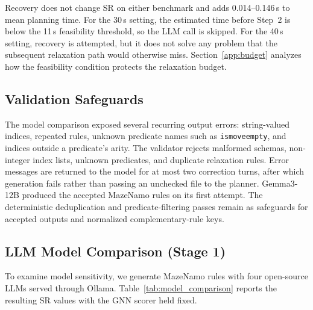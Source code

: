 \documentclass{ieeeaccess}
\newcommand{\sref}[1]{Section~\ref{#1}}
\newcommand{\tref}[1]{Table~\ref{#1}}
\begin{document}
Recovery does not change SR on either benchmark and adds 0.014--0.146\,s to mean planning time.
For the 30\,s setting, the estimated time before Step~2 is below the 11\,s feasibility threshold, so the LLM call is skipped. For the 40\,s setting, recovery is attempted, but it does not solve any problem that the subsequent relaxation path would otherwise miss.
\sref{app:budget} analyzes how the feasibility condition protects the relaxation budget.

\subsection{Validation Safeguards}
\label{sec:ablation_pipeline}

The model comparison exposed several recurring output errors: string-valued indices, repeated rules, unknown predicate names such as \texttt{ismoveempty}, and indices outside a predicate's arity.
The validator rejects malformed schemas, non-integer index lists, unknown predicates, and duplicate relaxation rules. Error messages are returned to the model for at most two correction turns, after which generation fails rather than passing an unchecked file to the planner.
Gemma3-12B produced the accepted MazeNamo rules on its first attempt. The deterministic deduplication and predicate-filtering passes remain as safeguards for accepted outputs and normalized complementary-rule keys.

\subsection{LLM Model Comparison (Stage 1)}
\label{sec:model_comparison}

To examine model sensitivity, we generate MazeNamo rules with four open-source LLMs served through Ollama.
\tref{tab:model_comparison} reports the resulting SR values with the GNN scorer held fixed.
\end{document}
